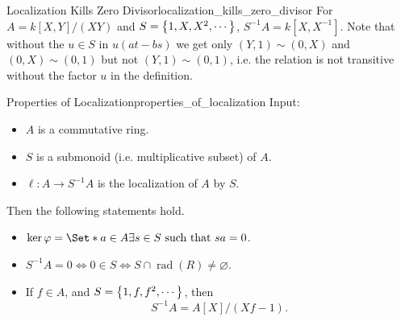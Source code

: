 \documentclass{article}
\begin{document}
\begin{example}{Localization Kills Zero Divisor}{localization_kills_zero_divisor}
    For $A = k[X,Y]/(XY)$ and $S = \qty{1,X,X^2,\cdots}$, $S^{-1}A = k[X,X^{-1}]$.
    Note that without the $u\in S$ in $u(at - bs)$ we get only $(Y,1) \sim (0,X)$ and $(0,X)\sim (0,1)$ but not $(Y,1) \sim (0,1)$, i.e. the relation is not transitive without the factor $u$ in the definition.
\end{example}

\begin{proposition}{Properties of Localization}{properties_of_localization}
    Input:
    \begin{itemize}
        \item $A$ is a commutative ring.
        \item $S$ is a submonoid (i.e. multiplicative subset) of $A$.
        \item $\ell:A\rightarrow S^{-1}A$ is the localization of $A$ by $S$.
    \end{itemize}
    Then the following statements hold.
    \begin{itemize}
        \item $\ker \varphi = \Set*{a\in A}{\exists s\in S \text{ such that } sa = 0}$.
        \item $S^{-1}A = 0 \Longleftrightarrow 0\in S \Longleftrightarrow S\cap \operatorname{rad}(R) \neq \varnothing$.
        \item If $f \in A$, and $S = \qty{1,f,f^2,\cdots}$, then
        \[ S^{-1}A = A[X]/(Xf - 1). \]
    \end{itemize}
\end{proposition}
\end{document}
